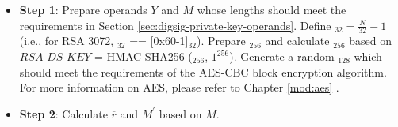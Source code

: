 \documentclass[main\_\_EN.tex]{subfiles}
\begin{document}
\begin{itemize}

    \item {\bfseries Step 1}: Prepare operands \begin{math}Y\end{math} and \begin{math}M\end{math} whose lengths should meet the requirements in Section \ref{sec:digsig-private-key-operands}. Define \begin{math}[L]_{32} = \frac{N}{32}-1 \end{math} (i.e., for RSA 3072, \begin{math}[L]_{32}\end{math} == [0x60-1]\begin{math}_{32}\end{math}). Prepare \begin{math}[HMAC\_KEY]_{256}\end{math} and calculate \begin{math}[RSA\_DS\_KEY]_{256}\end{math} based on \begin{math}RSA\_DS\_KEY\end{math} = HMAC-SHA256 (\begin{math}[HMAC\_KEY]_{256}\end{math}, \begin{math}1^{256}\end{math}). Generate a random \begin{math}[IV]_{128}\end{math} which should meet the requirements of the AES-CBC block encryption algorithm. For more information on AES, please refer to Chapter \ref{mod:aes} \textit{}.

    \item {\bfseries Step 2}: Calculate \begin{math}\overline{r}\end{math} and \begin{math}M^{\prime} \end{math} based on \begin{math}M\end{math}.


\end{itemize}
\end{document}
